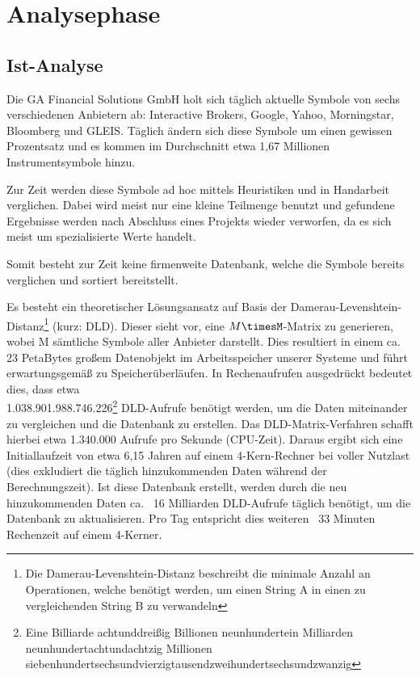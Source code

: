 \section{Analysephase}
\label{section:analysephase}
\subsection{Ist-Analyse}
Die GA Financial Solutions GmbH holt sich täglich aktuelle Symbole von sechs verschiedenen
Anbietern ab: Interactive Brokers, Google, Yahoo, Morningstar, Bloomberg und GLEIS.
Täglich ändern sich diese Symbole um einen gewissen Prozentsatz und es kommen im Durchschnitt etwa 1,67 Millionen Instrumentsymbole hinzu.\par

Zur Zeit werden diese Symbole ad hoc mittels Heuristiken und in Handarbeit verglichen.
Dabei wird meist nur eine kleine Teilmenge benutzt und gefundene Ergebnisse werden
nach Abschluss eines Projekts wieder verworfen, da es sich meist um spezialisierte Werte handelt.\par

Somit besteht zur Zeit keine firmenweite Datenbank, welche die Symbole
bereits verglichen und sortiert bereitstellt.\par

Es besteht ein theoretischer Lösungsansatz auf Basis der Damerau-Levenshtein-Distanz\footnote{Die Damerau-Levenshtein-Distanz\cite{dl_distance} beschreibt die minimale Anzahl
	an Operationen, welche benötigt werden, um einen String A in einen zu
	vergleichenden String B zu verwandeln} (kurz: DLD). Dieser sieht vor, eine $M\timesM$-Matrix zu generieren, wobei M sämtliche Symbole aller
Anbieter darstellt. Dies resultiert in einem ca. 23 PetaBytes großem Datenobjekt
im Arbeitsspeicher unserer Systeme und führt erwartungsgemäß zu Speicherüberläufen.
In Rechenaufrufen ausgedrückt bedeutet dies, dass etwa \\
1.038.901.988.746.226\footnote{Eine Billiarde achtunddreißig Billionen neunhundertein Milliarden neunhundertachtundachtzig Millionen siebenhundertsechsundvierzigtausendzweihundertsechsundzwanzig} DLD-Aufrufe benötigt werden, um die Daten miteinander
zu vergleichen und die Datenbank zu erstellen. Das DLD-Matrix-Verfahren schafft hierbei 
etwa 1.340.000 Aufrufe pro Sekunde (CPU-Zeit).
Daraus ergibt sich eine Initiallaufzeit von etwa 6,15 Jahren auf einem 4-Kern-Rechner bei voller Nutzlast (dies exkludiert die täglich hinzukommenden Daten
während der Berechnungszeit). Ist diese Datenbank erstellt, werden durch die neu
hinzukommenden Daten ca. ~16 Milliarden DLD-Aufrufe täglich benötigt, um die
Datenbank zu aktualisieren. Pro Tag entspricht dies weiteren ~33 Minuten Rechenzeit auf
einem 4-Kerner.\par

